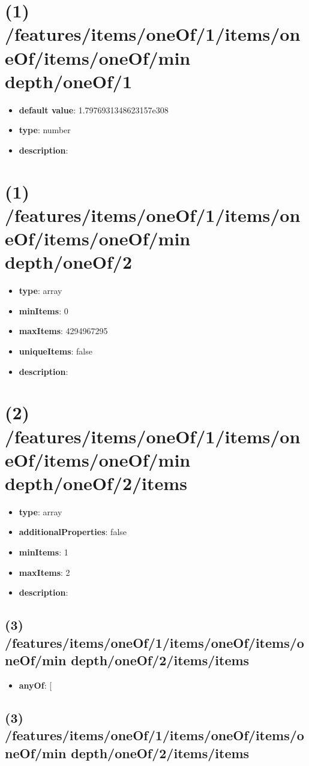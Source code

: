 \section{(1) /features/items/oneOf/1/items/oneOf/items/oneOf/min depth/oneOf/1}
\begin{itemize}[leftmargin=1em]\item {\bf default value}: 1.7976931348623157e308
\item {\bf type}: number
\item {\bf description}: 
\end{itemize}\section{(1) /features/items/oneOf/1/items/oneOf/items/oneOf/min depth/oneOf/2}
\begin{itemize}[leftmargin=1em]\item {\bf type}: array
\item {\bf minItems}: 0
\item {\bf maxItems}: 4294967295
\item {\bf uniqueItems}: false
\item {\bf description}: 
\end{itemize}\section{(2) /features/items/oneOf/1/items/oneOf/items/oneOf/min depth/oneOf/2/items}
\begin{itemize}[leftmargin=2em]\item {\bf type}: array
\item {\bf additionalProperties}: false
\item {\bf minItems}: 1
\item {\bf maxItems}: 2
\item {\bf description}: 
\end{itemize}\subsection{(3) /features/items/oneOf/1/items/oneOf/items/oneOf/min depth/oneOf/2/items/items}
\begin{itemize}[leftmargin=3em]\item {\bf anyOf}: [\end{itemize}\subsection{(3) /features/items/oneOf/1/items/oneOf/items/oneOf/min depth/oneOf/2/items/items}
